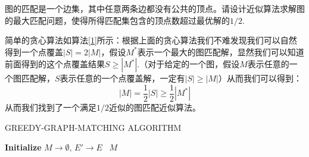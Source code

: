 \documentclass{myhw}
\begin{document}
\begin{homeworkProblem}
图的匹配是一个边集，其中任意两条边都没有公共的顶点。请设计近似算法求解图的最大匹配问题，使得所得匹配集包含的顶点数超过最优解的$1/2$.
\end{homeworkProblem}

\begin{solution}
简单的贪心算法如算法\ref{1}所示：根据上面的贪心算法我们不难发现我们可以自然得到一个点覆盖$|S|=2|M|$，假设$M^\ast$表示一个最大的图匹配解，显然我们可以知道前面得到的这个点覆盖结果$S\geq |M^\ast|$.（对于给定的一个图，假设$M$表示任意的一个图匹配解，$S$表示任意的一个点覆盖解，一定有$|S|\geq |M|$）从而我们可以得到：
\[
|M|=\frac{1}{2}|S|\geq \frac{1}{2}|M^\ast|
\]
从而我们找到了一个满足$1/2$近似的图匹配近似算法。

\begin{algorithm}[H]
\caption{GREEDY-GRAPH-MATCHING ALGORITHM}
\label{1}
\LinesNumbered
{}
\textbf{Initialize} $M\rightarrow \emptyset$, $E'\rightarrow E$\;
\
\Return $M$ 
\end{algorithm}

\end{solution}
\end{document}
